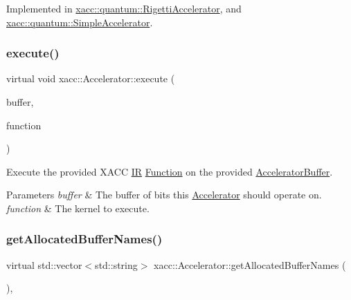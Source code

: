 Implemented in \hyperlink{a00919_a731551c94b1abef40d2cf032e8712df6}{xacc\+::quantum\+::\+Rigetti\+Accelerator}, and \hyperlink{a00943_adb9393692e9f484df241aa5d014030d1}{xacc\+::quantum\+::\+Simple\+Accelerator}.

\mbox{\label{a01087_a89b3f3e6294f228abf03a410b0fb1674}} 
\subsubsection{\texorpdfstring{execute()}{execute()}}
{\footnotesize\ttfamily virtual void xacc\+::\+Accelerator\+::execute (\begin{DoxyParamCaption}\item[{std\+::shared\+\_\+ptr$<$ \hyperlink{a01099}{Accelerator\+Buffer} $>$}]{buffer,  }\item[{const std\+::shared\+\_\+ptr$<$ \hyperlink{a01127}{Function} $>$}]{function }\end{DoxyParamCaption})\hspace{0.3cm}{\ttfamily [pure virtual]}}

Execute the provided X\+A\+CC \hyperlink{a01151}{IR} \hyperlink{a01127}{Function} on the provided \hyperlink{a01099}{Accelerator\+Buffer}.


\begin{DoxyParams}{Parameters}
{\em buffer} & The buffer of bits this \hyperlink{a01087}{Accelerator} should operate on. \\
\hline
{\em function} & The kernel to execute. \\
\hline
\end{DoxyParams}
\mbox{\label{a01087_ae1463d7e405df89fa4af47e8922f4b82}} 
\subsubsection{\texorpdfstring{get\+Allocated\+Buffer\+Names()}{getAllocatedBufferNames()}}
{\footnotesize\ttfamily virtual std\+::vector$<$std\+::string$>$ xacc\+::\+Accelerator\+::get\+Allocated\+Buffer\+Names (\begin{DoxyParamCaption}{ }\end{DoxyParamCaption})\hspace{0.3cm}{\ttfamily [inline]}, {\ttfamily [virtual]}}

